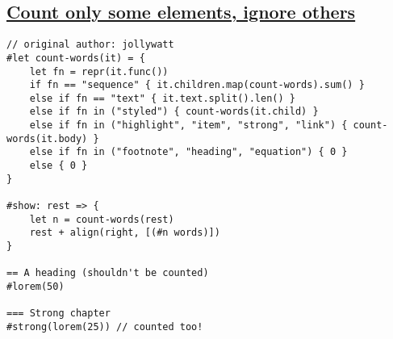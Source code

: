 \pandocbounded{}

\subsection{\texorpdfstring{\hyperref[count-only-some-elements-ignore-others]{Count
only some elements, ignore
others}}{Count only some elements, ignore others}}\label{count-only-some-elements-ignore-others}

\begin{verbatim}
// original author: jollywatt
#let count-words(it) = {
    let fn = repr(it.func())
    if fn == "sequence" { it.children.map(count-words).sum() }
    else if fn == "text" { it.text.split().len() }
    else if fn in ("styled") { count-words(it.child) }
    else if fn in ("highlight", "item", "strong", "link") { count-words(it.body) }
    else if fn in ("footnote", "heading", "equation") { 0 }
    else { 0 }
}

#show: rest => {
    let n = count-words(rest)
    rest + align(right, [(#n words)])
}

== A heading (shouldn't be counted)
#lorem(50)

=== Strong chapter
#strong(lorem(25)) // counted too!
\end{verbatim}

\pandocbounded{}
